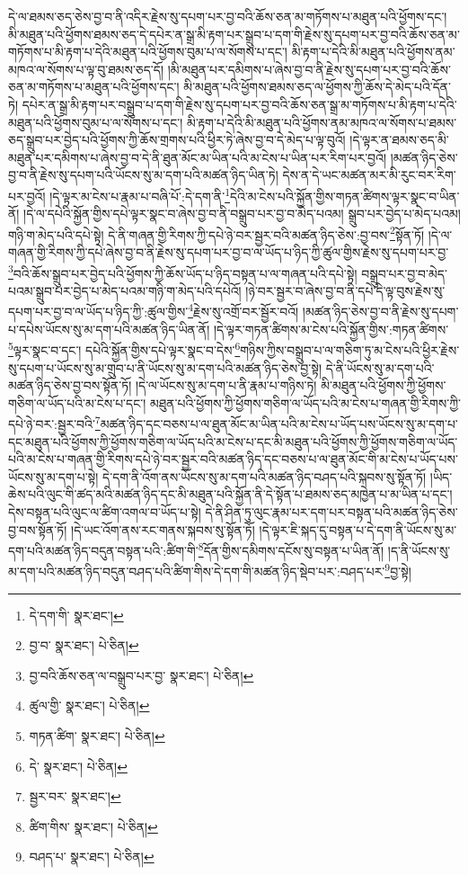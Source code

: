 དེ་ལ་ཐམས་ཅད་ཅེས་བྱ་བ་ནི་འདིར་རྗེས་སུ་དཔག་པར་བྱ་བའི་ཆོས་ཅན་མ་གཏོགས་པ་མཐུན་པའི་ཕྱོགས་དང་། མི་མཐུན་པའི་ཕྱོགས་ཐམས་ཅད་དེ་དཔེར་ན་སྒྲ་མི་རྟག་པར་སྒྲུབ་པ་དག་གི་རྗེས་སུ་དཔག་པར་བྱ་བའི་ཆོས་ཅན་མ་གཏོགས་པ་མི་རྟག་པ་དེའི་མཐུན་པའི་ཕྱོགས་བུམ་པ་ལ་སོགས་པ་དང་། མི་རྟག་པ་དེའི་མི་མཐུན་པའི་ཕྱོགས་ནམ་མཁའ་ལ་སོགས་པ་ལྟ་བུ་ཐམས་ཅད་དོ། །མི་མཐུན་པར་དམིགས་པ་ཞེས་བྱ་བ་ནི་རྗེས་སུ་དཔག་པར་བྱ་བའི་ཆོས་ཅན་མ་གཏོགས་པ་མཐུན་པའི་ཕྱོགས་དང་། མི་མཐུན་པའི་ཕྱོགས་ཐམས་ཅད་ལ་ཕྱོགས་ཀྱི་ཆོས་དེ་མེད་པའི་དོན་ཏེ། དཔེར་ན་སྒྲ་མི་རྟག་པར་བསྒྲུབ་པ་དག་གི་རྗེས་སུ་དཔག་པར་བྱ་བའི་ཆོས་ཅན་སྒྲ་མ་གཏོགས་པ་མི་རྟག་པ་དེའི་མཐུན་པའི་ཕྱོགས་བུམ་པ་ལ་སོགས་པ་དང་། མི་རྟག་པ་དེའི་མི་མཐུན་པའི་ཕྱོགས་ནམ་མཁའ་ལ་སོགས་པ་ཐམས་ཅད་སྒྲུབ་པར་བྱེད་པའི་ཕྱོགས་ཀྱི་ཆོས་གྲགས་པའི་ཕྱིར་ཏེ་ཞེས་བྱ་བ་དེ་མེད་པ་ལྟ་བུའོ། །དེ་ལྟར་ན་ཐམས་ཅད་མི་མཐུན་པར་དམིགས་པ་ཞེས་བྱ་བ་དེ་ནི་ཐུན་མོང་མ་ཡིན་པའི་མ་ངེས་པ་ཡིན་པར་རིག་པར་བྱའོ། །མཚན་ཉིད་ཅེས་བྱ་བ་ནི་རྗེས་སུ་དཔག་པའི་ཡོངས་སུ་མ་དག་པའི་མཚན་ཉིད་ཡིན་ཏེ། དེས་ན་དེ་ཡང་མཚན་མར་མི་རུང་བར་རིག་པར་བྱའོ། །དེ་ལྟར་མ་ངེས་པ་རྣམ་པ་བཞི་པོ་:དེ་དག་ནི་\footnote{དེ་དག་གི་  སྣར་ཐང་། }དེའི་མ་ངེས་པའི་སྐྱོན་གྱིས་གཏན་ཚིགས་ལྟར་སྣང་བ་ཡིན་ནོ། །དེ་ལ་དཔེའི་སྐྱོན་གྱིས་དཔེ་ལྟར་སྣང་བ་ཞེས་བྱ་བ་ནི་བསྒྲུབ་པར་བྱ་བ་མེད་པའམ། སྒྲུབ་པར་བྱེད་པ་མེད་པའམ། གཉི་ག་མེད་པའི་དཔེ་སྟེ། དེ་ནི་གཞན་གྱི་རིགས་ཀྱི་དཔེ་ཉེ་བར་སྦྱར་བའི་མཚན་ཉིད་ཅེས་:བྱ་བས་\footnote{བྱ་བ་  སྣར་ཐང་།  པེ་ཅིན། }སྟོན་ཏོ། །དེ་ལ་གཞན་གྱི་རིགས་ཀྱི་དཔེ་ཞེས་བྱ་བ་ནི་རྗེས་སུ་དཔག་པར་བྱ་བ་ལ་ཡོད་པ་ཉིད་ཀྱི་ཚུལ་གྱིས་རྗེས་སུ་དཔག་པར་བྱ་\footnote{བྱ་བའི་ཆོས་ཅན་ལ་བསྒྲུབ་པར་བྱ་  སྣར་ཐང་།  པེ་ཅིན། }བའི་ཆོས་སྒྲུབ་པར་བྱེད་པའི་ཕྱོགས་ཀྱི་ཆོས་ཡོད་པ་ཉིད་བསྟན་པ་ལ་གཞན་པའི་དཔེ་སྟེ། བསྒྲུབ་པར་བྱ་བ་མེད་པའམ་སྒྲུབ་པར་བྱེད་པ་མེད་པའམ་གཉི་ག་མེད་པའི་དཔེའོ། །ཉེ་བར་སྦྱར་བ་ཞེས་བྱ་བ་ནི་དཔེ་དེ་ལྟ་བུས་རྗེས་སུ་དཔག་པར་བྱ་བ་ལ་ཡོད་པ་ཉིད་ཀྱི་:ཚུལ་གྱིས་\footnote{ཚུལ་གྱི་  སྣར་ཐང་།  པེ་ཅིན། }རྗེས་སུ་འགྲོ་བར་སྦྱོར་བའོ། །མཚན་ཉིད་ཅེས་བྱ་བ་ནི་རྗེས་སུ་དཔག་པ་དཔེས་ཡོངས་སུ་མ་དག་པའི་མཚན་ཉིད་ཡིན་ནོ། །དེ་ལྟར་གཏན་ཚིགས་མ་ངེས་པའི་སྐྱོན་གྱིས་:གཏན་ཚིགས་\footnote{གཏན་ཚིག་  སྣར་ཐང་།  པེ་ཅིན། }ལྟར་སྣང་བ་དང་། དཔེའི་སྐྱོན་གྱིས་དཔེ་ལྟར་སྣང་བ་དེས་\footnote{དེ་  སྣར་ཐང་།  པེ་ཅིན། }གཉིས་ཀྱིས་བསྒྲུབ་པ་ལ་གཅིག་ཏུ་མ་ངེས་པའི་ཕྱིར་རྗེས་སུ་དཔག་པ་ཡོངས་སུ་མ་གྲུབ་པ་ནི་ཡོངས་སུ་མ་དག་པའི་མཚན་ཉིད་ཅེས་བྱ་སྟེ། དེ་ནི་ཡོངས་སུ་མ་དག་པའི་མཚན་ཉིད་ཅེས་བྱ་བས་སྟོན་ཏོ། །དེ་ལ་ཡོངས་སུ་མ་དག་པ་ནི་རྣམ་པ་གཉིས་ཏེ། མི་མཐུན་པའི་ཕྱོགས་ཀྱི་ཕྱོགས་གཅིག་ལ་ཡོད་པའི་མ་ངེས་པ་དང་། མཐུན་པའི་ཕྱོགས་ཀྱི་ཕྱོགས་གཅིག་ལ་ཡོད་པའི་མ་ངེས་པ་གཞན་གྱི་རིགས་ཀྱི་དཔེ་ཉེ་བར་:སྦྱར་བའི་\footnote{སྦྱར་བར་  སྣར་ཐང་། }མཚན་ཉིད་དང་བཅས་པ་ལ་ཐུན་མོང་མ་ཡིན་པའི་མ་ངེས་པ་ཡོད་པས་ཡོངས་སུ་མ་དག་པ་དང་མཐུན་པའི་ཕྱོགས་ཀྱི་ཕྱོགས་གཅིག་ལ་ཡོད་པའི་མ་ངེས་པ་དང་མི་མཐུན་པའི་ཕྱོགས་ཀྱི་ཕྱོགས་གཅིག་ལ་ཡོད་པའི་མ་ངེས་པ་གཞན་གྱི་རིགས་དཔེ་ཉེ་བར་སྦྱར་བའི་མཚན་ཉིད་དང་བཅས་པ་ལ་ཐུན་མོང་གི་མ་ངེས་པ་ཡོད་པས་ཡོངས་སུ་མ་དག་པ་སྟེ། དེ་དག་ནི་འོག་ནས་ཡོངས་སུ་མ་དག་པའི་མཚན་ཉིད་བཤད་པའི་སྐབས་སུ་སྟོན་ཏོ། །ཡིད་ཆེས་པའི་ལུང་གི་ཚད་མའི་མཚན་ཉིད་དང་མི་མཐུན་པའི་སྐྱོན་ནི་དེ་སྟོན་པ་ཐམས་ཅད་མཁྱེན་པ་མ་ཡིན་པ་དང་། དེས་བསྟན་པའི་ལུང་ལ་ཚིག་འགལ་བ་ཡོད་པ་སྟེ། དེ་ནི་ཤིན་ཏུ་ལུང་རྣམ་པར་དག་པར་བསྟན་པའི་མཚན་ཉིད་ཅེས་བྱ་བས་སྟོན་ཏོ། །དེ་ཡང་འོག་ནས་རང་གནས་སྐབས་སུ་སྟོན་ཏོ། །དེ་ལྟར་ཇི་སྐད་དུ་བསྟན་པ་དེ་དག་ནི་ཡོངས་སུ་མ་དག་པའི་མཚན་ཉིད་བདུན་བསྟན་པའི་:ཚིག་གི་\footnote{ཚིག་གིས་  སྣར་ཐང་།  པེ་ཅིན། }དོན་གྱིས་དམིགས་དངོས་སུ་བསྟན་པ་ཡིན་ནོ། །ད་ནི་ཡོངས་སུ་མ་དག་པའི་མཚན་ཉིད་བདུན་བཤད་པའི་ཚིག་གིས་དེ་དག་གི་མཚན་ཉིད་སྡེབ་པར་:བཤད་པར་\footnote{བཤད་པ་  སྣར་ཐང་།  པེ་ཅིན། }བྱ་སྟེ། 